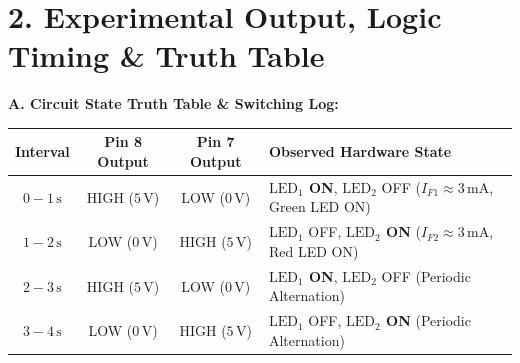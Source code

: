 \documentclass[11pt,a4paper]{article}
\begin{document}
\vspace{0.06cm}

\section*{2. Experimental Output, Logic Timing \& Truth Table}

\noindent
\textbf{A. Circuit State Truth Table \& Switching Log:}\par\vspace{0.06cm}
{\footnotesize
\setlength{\tabcolsep}{5pt}
\renewcommand{\arraystretch}{1.18}
\begin{tabularx}{\textwidth}{|c|c|c|X|}
\hline
\textbf{Interval} & \textbf{Pin 8 Output} & \textbf{Pin 7 Output} & \textbf{Observed Hardware State} \\
\hline
$0 - 1\,\text{s}$ & HIGH ($5\,\text{V}$) & LOW ($0\,\text{V}$) & \textbf{$\text{LED}_1$ ON}, $\text{LED}_2$ OFF ($I_{F1} \approx 3\,\text{mA}$, Green LED ON) \\
$1 - 2\,\text{s}$ & LOW ($0\,\text{V}$) & HIGH ($5\,\text{V}$) & $\text{LED}_1$ OFF, \textbf{$\text{LED}_2$ ON} ($I_{F2} \approx 3\,\text{mA}$, Red LED ON) \\
$2 - 3\,\text{s}$ & HIGH ($5\,\text{V}$) & LOW ($0\,\text{V}$) & \textbf{$\text{LED}_1$ ON}, $\text{LED}_2$ OFF (Periodic Alternation) \\
$3 - 4\,\text{s}$ & LOW ($0\,\text{V}$) & HIGH ($5\,\text{V}$) & $\text{LED}_1$ OFF, \textbf{$\text{LED}_2$ ON} (Periodic Alternation) \\
\hline
\end{tabularx}
}

\vspace{0.20cm}
\end{document}
